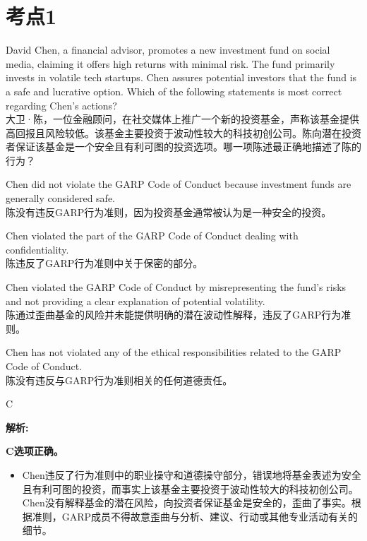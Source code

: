 \documentclass{article}
\newcounter{question} %
\newenvironment{explanation}
{\textbf{解析:}\par}
{\par}
\begin{document}
 \tableofcontents %
\newpage


\iftrue
\section{考点1}
\setcounter{question}{0}


\begin{question}
    David Chen, a financial advisor, promotes a new investment fund on social media, claiming it offers high returns with minimal risk. The fund primarily invests in volatile tech startups. Chen assures potential investors that the fund is a safe and lucrative option. Which of the following statements is most correct regarding Chen’s actions?\\
    大卫·陈，一位金融顾问，在社交媒体上推广一个新的投资基金，声称该基金提供高回报且风险较低。该基金主要投资于波动性较大的科技初创公司。陈向潜在投资者保证该基金是一个安全且有利可图的投资选项。哪一项陈述最正确地描述了陈的行为？
\end{question}

\begin{choices}
    \item Chen did not violate the GARP Code of Conduct because investment funds are generally considered safe.\\
    陈没有违反GARP行为准则，因为投资基金通常被认为是一种安全的投资。
    \item Chen violated the part of the GARP Code of Conduct dealing with confidentiality.\\
    陈违反了GARP行为准则中关于保密的部分。
    \item Chen violated the GARP Code of Conduct by misrepresenting the fund's risks and not providing a clear explanation of potential volatility.\\
    陈通过歪曲基金的风险并未能提供明确的潜在波动性解释，违反了GARP行为准则。
    \item Chen has not violated any of the ethical responsibilities related to the GARP Code of Conduct.\\
    陈没有违反与GARP行为准则相关的任何道德责任。
\end{choices}

\begin{correctanswer}
C
\end{correctanswer}

\begin{explanation}
    \textbf{C选项正确。}
    \begin{itemize}
   \item Chen违反了行为准则中的职业操守和道德操守部分，错误地将基金表述为安全且有利可图的投资，而事实上该基金主要投资于波动性较大的科技初创公司。Chen没有解释基金的潜在风险，向投资者保证基金是安全的，歪曲了事实。根据准则，GARP成员不得故意歪曲与分析、建议、行动或其他专业活动有关的细节。
    \end{itemize}
\end{explanation}
\end{document}
